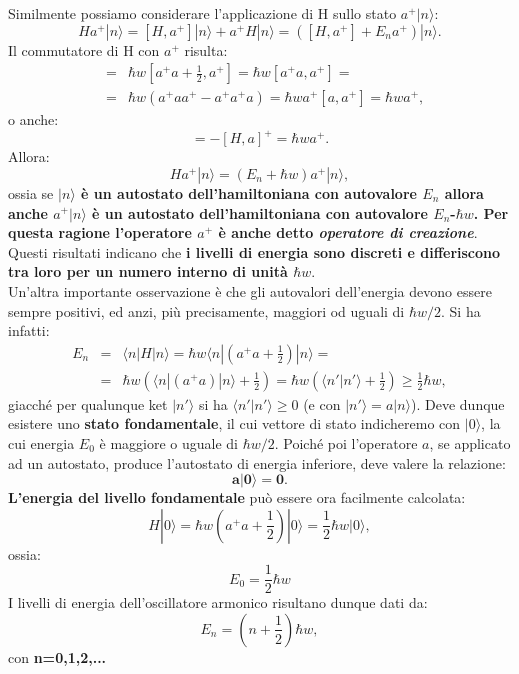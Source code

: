 \documentclass[a4paper,12pt,oneside]{book}
\begin{document}
 Similmente possiamo considerare l'applicazione di H sullo stato $a^+|n\rangle$:
\begin{equation}
Ha^+|n\rangle= [H,a^+]|n\rangle+a^+H|n\rangle=([H,a^+]+E_na^+)|n\rangle.
\end{equation}
Il commutatore di H con $a^+$ risulta:
\begin{eqnarray}
	[H,a^+]&=&\hbar w[a^+a+\frac{1}{2},a^+]=\hbar w [a^+a,a^+]= \nonumber\\
	&=&\hbar w (a^+aa^+-a^+a^+a)=\hbar w a^+ [a,a^+]=\hbar wa^+,
\end{eqnarray}
o anche:
\begin{equation}
[H,a^+]=-[H,a]^+=\hbar w a^+.
\end{equation}
Allora:
\begin{equation}
Ha^+|n\rangle=(E_n+\hbar w)a^+|n\rangle,
\end{equation}
ossia se \textbf{$|n\rangle$ è un autostato dell'hamiltoniana con autovalore $E_n$ allora anche $a^+|n\rangle$ è  un autostato dell'hamiltoniana con autovalore $E_n$-$\hbar w$. Per questa ragione l'operatore $a^+$ è anche detto \textit{operatore di creazione}}. \\ 
 Questi risultati indicano che \textbf{i livelli di energia sono discreti e differiscono tra loro per un numero interno di unità $\hbar w$}.\\
 Un'altra importante osservazione è che gli autovalori dell'energia devono essere sempre positivi, ed anzi, più precisamente, maggiori od uguali di $\hbar w/2$. Si ha infatti:
\begin{eqnarray}
	E_n&=&\langle n|H|n \rangle= \hbar w \langle n|(a^+a+\frac{1}{2})|n\rangle= \nonumber \\
	&=&\hbar w (\langle n|(a^+a)|n\rangle+\frac{1}{2})=\hbar w (\langle n'|n'\rangle+\frac{1}{2}) \geq \frac{1}{2} \hbar w, 
\end{eqnarray}
giacché per qualunque ket $|n'\rangle$ si ha $\langle n'|n' \rangle\geq 0$ (e con $|n'\rangle= a|n\rangle$).
Deve dunque esistere uno \textbf{stato fondamentale}, il cui vettore di stato indicheremo con $|0\rangle$, la cui energia $E_0$ è maggiore o uguale di $\hbar w/2$. Poiché poi l'operatore $a$, se applicato ad un autostato, produce l'autostato di energia inferiore, deve valere la relazione:
\begin{equation}  \label{eq:cap11_7}
\mathbf{a|0\rangle=0}.
\end{equation}
 \textbf{L'energia del livello fondamentale} può essere ora facilmente calcolata:
\begin{equation}
H|0\rangle= \hbar w(a^+a+\frac{1}{2})|0\rangle= \frac{1}{2} \hbar w |0\rangle,
\end{equation}
ossia:
\begin{equation}
E_0=\frac{1}{2} \hbar w
\end{equation}
 I livelli di energia dell'oscillatore armonico risultano dunque dati da:
\begin{equation}
  \label{eq:cap11_8}
E_n=(n+\frac{1}{2}) \hbar w ,
\end{equation}
con   \textbf{n=0,1,2,...}
\end{document}
